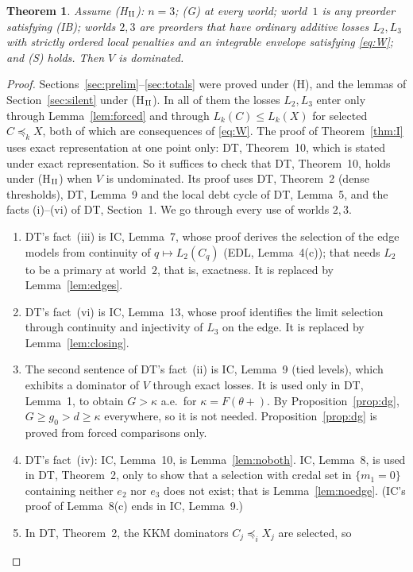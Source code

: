 \documentclass[11pt]{article}
\newtheorem{theorem}{Theorem}
\theoremstyle{definition}\newtheorem{definition}[theorem]{Definition}
\theoremstyle{remark}\newtheorem{remark}[theorem]{Remark}
\begin{document}
\begin{theorem}\label{thm:II}
Assume (H$_{\rm II}$): $n=3$; (G) at every world; world~$1$ is any preorder
satisfying (IB); worlds $2,3$ are preorders that have ordinary additive
losses $L_2,L_3$ with strictly ordered local penalties and an integrable
envelope satisfying \eqref{eq:W}; and (S) holds. Then $V$ is dominated.
\end{theorem}
\begin{proof}
Sections~\ref{sec:prelim}--\ref{sec:totals} were proved under (H), and the
lemmas of Section~\ref{sec:silent} under (H$_{\rm II}$). In all of them the
losses $L_2,L_3$ enter only through Lemma~\ref{lem:forced} and through
$L_k(C)\le L_k(X)$ for selected $C\preceq_kX$, both of which are consequences
of \eqref{eq:W}. The proof of Theorem~\ref{thm:I} uses exact representation at
one point only: DT, Theorem~10, which is stated under exact representation.
So it suffices to check that DT, Theorem~10, holds under (H$_{\rm II}$) when
$V$ is undominated. Its proof uses DT, Theorem~2 (dense thresholds), DT,
Lemma~9 and the local debt cycle of DT, Lemma~5, and the facts (i)--(vi) of
DT, Section~1. We go through every use of worlds $2,3$.
\begin{enumerate}[label=(\arabic*),leftmargin=*,itemsep=2pt]
\item DT's fact~(iii) is IC, Lemma~7, whose proof derives the selection of the
edge models from continuity of $q\mapsto L_2(C_q)$ (EDL, Lemma~4(c)); that
needs $L_2$ to be a primary at world~$2$, that is, exactness. It is replaced
by Lemma~\ref{lem:edges}.
\item DT's fact~(vi) is IC, Lemma~13, whose proof identifies the limit
selection through continuity and injectivity of $L_3$ on the edge. It is
replaced by Lemma~\ref{lem:closing}.
\item The second sentence of DT's fact~(ii) is IC, Lemma~9 (tied levels),
which exhibits a dominator of $V$ through exact losses. It is used only in
DT, Lemma~1, to obtain $G>\kappa$ a.e.\ for $\kappa=F(\theta+)$. By
Proposition~\ref{prop:dg}, $G\ge g_0>d\ge\kappa$ everywhere, so it is not
needed. Proposition~\ref{prop:dg} is proved from forced comparisons only.
\item DT's fact~(iv): IC, Lemma~10, is Lemma~\ref{lem:noboth}. IC, Lemma~8, is
used in DT, Theorem~2, only to show that a selection with credal set in
$\{m_1=0\}$ containing neither $e_2$ nor $e_3$ does not exist; that is
Lemma~\ref{lem:noedge}. (IC's proof of Lemma~8(c) ends in IC, Lemma~9.)
\item In DT, Theorem~2, the KKM dominators $C_j\preceq_iX_j$ are selected, so

\end{enumerate}
\end{proof}
\end{document}
